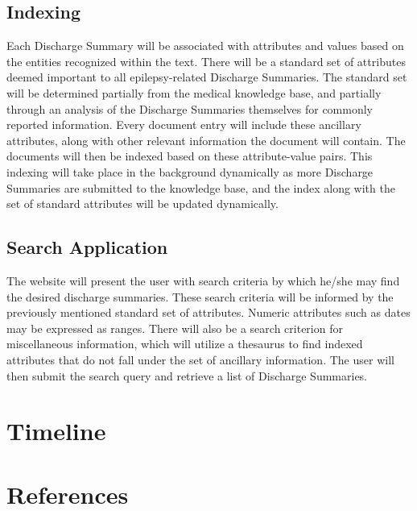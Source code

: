 \documentclass[12pt]{article}
\begin{document}
\subsection{Indexing}
Each Discharge Summary will be associated with attributes and values based on the
entities recognized within the text. There will be a standard set of attributes
deemed important to all epilepsy-related Discharge Summaries. The standard set will
be determined partially from the medical knowledge base, and partially through an
analysis of the Discharge Summaries themselves for commonly reported information.
Every document entry will include these ancillary attributes, along with other
relevant information the document will contain. The documents will then be indexed
based on these attribute-value pairs. This indexing will take place in the background
dynamically as more Discharge Summaries are submitted to the knowledge base, and
the index along with the set of standard attributes will be updated dynamically.

\subsection{Search Application}
The website will present the user with search criteria by which he/she may find
the desired discharge summaries. These search criteria will be informed by the 
previously mentioned standard set of attributes. Numeric attributes such as dates
may be expressed as ranges. There will also be a search criterion for miscellaneous
information, which will utilize a thesaurus to find indexed attributes that do not
fall under the set of ancillary information. The user will then submit the search
query and retrieve a list of Discharge Summaries.

\section{Timeline}

\section{References}
{}

\end{document}
